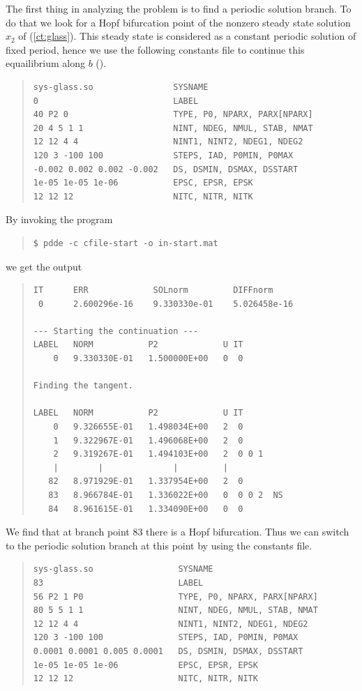 \documentclass[10pt,a4paper]{ddedoc}
\begin{document}
The first thing in analyzing the problem is to find a periodic solution
branch. To do that we look for a Hopf bifurcation point of the nonzero steady state solution
$x_2$ of (\ref{ct:glass}). This steady state is considered as a constant periodic solution of
fixed period, hence we use the following constants file to continue this equailibrium along $b$ ().
{ \small \begin{quote} \begin{lstlisting}[basicstyle=\tt,frame=single]
sys-glass.so                SYSNAME
0                           LABEL
40 P2 0                     TYPE, P0, NPARX, PARX[NPARX]
20 4 5 1 1                  NINT, NDEG, NMUL, STAB, NMAT
12 12 4 4                   NINT1, NINT2, NDEG1, NDEG2
120 3 -100 100              STEPS, IAD, P0MIN, P0MAX
-0.002 0.002 0.002 -0.002   DS, DSMIN, DSMAX, DSSTART
1e-05 1e-05 1e-06           EPSC, EPSR, EPSK
12 12 12                    NITC, NITR, NITK
\end{lstlisting} \end{quote} } \noindent
By invoking the program
{ \small \begin{quote} \begin{lstlisting}[basicstyle=\tt,frame=single]
$ pdde -c cfile-start -o in-start.mat
\end{lstlisting} \end{quote} } \noindent
we get the output
{ \small \begin{quote} \begin{lstlisting}[basicstyle=\tt,frame=single]
IT      ERR             SOLnorm         DIFFnorm
 0      2.600296e-16    9.330330e-01    5.026458e-16

--- Starting the continuation ---
LABEL   NORM           P2             U IT
    0   9.330330E-01   1.500000E+00   0  0

Finding the tangent.

LABEL   NORM           P2             U IT
    0   9.326655E-01   1.498034E+00   2  0
    1   9.322967E-01   1.496068E+00   2  0
    2   9.319267E-01   1.494103E+00   2  0 0 1
    |        |              |         |
   82   8.971929E-01   1.337954E+00   2  0
   83   8.966784E-01   1.336022E+00   0  0 0 2  NS
   84   8.961615E-01   1.334090E+00   0  0
\end{lstlisting} \end{quote} } \noindent
We find that at branch point 83 there is a Hopf bifurcation. Thus we can switch to the periodic solution branch at this point
by using the constants file.
{ \small \begin{quote} \begin{lstlisting}[basicstyle=\tt,frame=single]
sys-glass.so                 SYSNAME
83                           LABEL
56 P2 1 P0                   TYPE, P0, NPARX, PARX[NPARX]
80 5 5 1 1                   NINT, NDEG, NMUL, STAB, NMAT
12 12 4 4                    NINT1, NINT2, NDEG1, NDEG2
120 3 -100 100               STEPS, IAD, P0MIN, P0MAX
0.0001 0.0001 0.005 0.0001   DS, DSMIN, DSMAX, DSSTART
1e-05 1e-05 1e-06            EPSC, EPSR, EPSK
12 12 12                     NITC, NITR, NITK
\end{lstlisting} \end{quote} } \noindent
\end{document}
